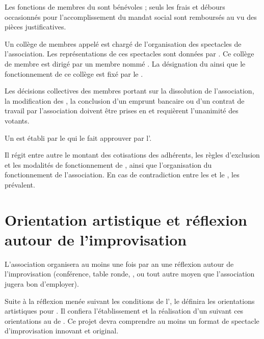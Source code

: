 \label{sec:remuneration}
Les fonctions de membres du \bureau{} sont bénévoles ; seuls les frais et
débours occasionnés pour l'accomplissement du mandat social sont
remboursés au vu des pièces justificatives.

\label{sec:troupe}
Un collège de membres appelé \textit{\troupe{}} est chargé de
l'organisation des spectacles de l'association. Les représentations de
ces spectacles sont données par \troupe{}. Ce collège de membre est
dirigé par un membre nommé \DA{}. La désignation du \DA{} ainsi que le
fonctionnement de ce collège est fixé par le \RI{}.

\label{sec:decisions-extra}
Les décisions collectives des membres portant sur la dissolution de
l'association, la modification des \statuts{}, la conclusion d'un emprunt
bancaire ou d'un contrat de travail par l'association doivent être prises en \AG{} et requièrent l'unanimité des votants.

\label{sec:reglement}
Un \RI{} est établi par le \bureau{} qui le fait approuver
par l'\AG{}.

Il régit entre autre le montant des cotisations des adhérents, les règles d'exclusion et les modalités de fonctionnement de \troupe{}, ainsi que l'organisation du fonctionnement de l'association. En cas de contradiction entre les \statuts{} et le \RI{}, les \statuts{} prévalent.


\section{Orientation artistique et réflexion autour de l'improvisation}
\label{sec:reflexions}
L'association organisera au moins une fois par an une réflexion autour
de l'improvisation (conférence, table ronde, \AG{}, ou
tout autre moyen que l'association jugera bon d'employer).


\label{sec:projet}
Suite à la réflexion menée suivant les conditions de l', le \bureau{} définira les orientations artistiques pour \troupe{}. Il confiera l'établissement et la réalisation d'un \PA{} suivant ces orientations au \DA{} de \troupe{}. Ce projet devra comprendre au moins un format de spectacle d'improvisation innovant et original.


